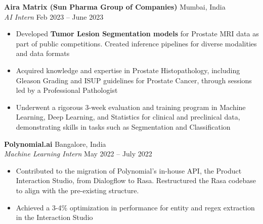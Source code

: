 \documentclass[a4paper,10pt]{extarticle}
\begin{document}
{%
\noindent
\textbf{Aira Matrix \small{(Sun Pharma Group of Companies)}} \hfill Mumbai, India\\ %
\textit{AI Intern} \hfill Feb 2023 – June 2023 %
\begin{itemize}
    \vspace{1.5mm}\item Developed \textbf{Tumor Lesion Segmentation models} for Prostate MRI data as part of public competitions. Created inference pipelines for diverse modalities and data formats
    \vspace{1.5mm}\item Acquired knowledge and expertise in Prostate Histopathology, including Gleason Grading and ISUP guidelines for Prostate Cancer, through sessions led by a Professional Pathologist
    \vspace{1.5mm}\item Underwent a rigorous 3-week evaluation and training program in Machine Learning, Deep Learning, and Statistics for clinical and preclinical data, demonstrating skills in tasks such as Segmentation and Classification
\end{itemize}

\noindent
\textbf{Polynomial.ai} \hfill Bangalore, India\\ %
\textit{Machine Learning Intern} \hfill May 2022 – July 2022 %
\begin{itemize}
    \item Contributed to the migration of Polynomial's in-house API, the Product Interaction Studio, from Dialogflow to Rasa. Restructured the Rasa codebase to align with the pre-existing structure. 
    \vspace{1.2mm}\item Achieved a 3-4\% optimization in performance for entity and regex extraction in the Interaction Studio
\end{itemize}

}
\end{document}
